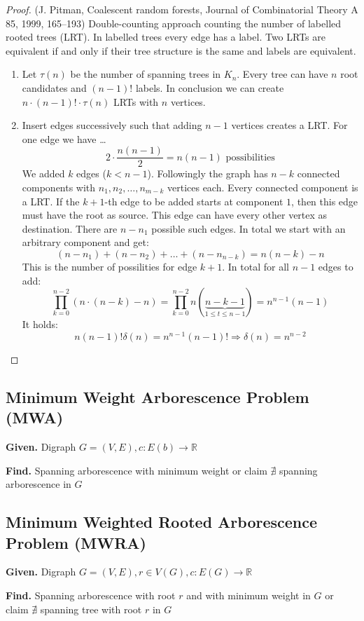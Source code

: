\documentclass{article}
\newcommand{\given}[1]{\textbf{Given.} #1\par}
\newcommand{\find}[1]{\textbf{Find.} #1\par}
\begin{document}
\begin{proof}
(J. Pitman, Coalescent random forests, Journal of Combinatorial Theory A 85, 1999, 165--193)
Double-counting approach counting the number of labelled rooted trees (LRT). In labelled trees every edge has a label. Two LRTs are equivalent if and only if their tree structure is the same and labels are equivalent.

\begin{enumerate}
  \item Let $\tau(n)$ be the number of spanning trees in $K_n$. Every tree can have $n$ root candidates and $(n-1)!$ labels. In conclusion we can create $n \cdot (n-1)! \cdot \tau(n)$ LRTs with $n$ vertices.
  \item Insert edges successively such that adding $n-1$ vertices creates a LRT. For one edge we have \dots
    \[
      2 \cdot \frac{n(n-1)}{2} = n(n-1) \text{ possibilities}
    \]
    We added $k$ edges ($k < n -1$). Followingly the graph has $n-k$ connected components with $n_1, n_2, \ldots, n_{m-k}$ vertices each. Every connected component is a LRT. If the $k+1$-th edge to be added starts at component $1$, then this edge must have the root as source. This edge can have every other vertex as destination. There are $n-n_1$ possible such edges. In total we start with an arbitrary component and get:
    \[
      (n - n_1) + (n - n_2) + \ldots + (n - n_{n-k}) = n (n-k) - n
    \]
    This is the number of possilities for edge $k+1$.
    In total for all $n-1$ edges to add:
    \[
      \prod_{k=0}^{n-2} (n \cdot (n-k) - n) = \prod_{k=0}^{n-2} n (\underbrace{n - k - 1}_{1 \leq t \leq n-1}) = n^{n-1} (n - 1)
    \]
    It holds:
    \[
      n (n-1) ! \delta(n) = n^{n-1} (n-1)! \Rightarrow \delta(n) = n^{n-2}
    \]
\end{enumerate}
\end{proof}

\subsection{Minimum Weight Arborescence Problem (MWA)}
%
\given{Digraph $G = (V, E), c: E(b) \rightarrow \mathbb{R}$}
\find{Spanning arborescence with minimum weight or claim $\nexists$ spanning arborescence in $G$}
%
\subsection{Minimum Weighted Rooted Arborescence Problem (MWRA)}
%
\given{Digraph $G = (V, E), r \in V(G), c: E(G) \rightarrow \mathbb{R}$}
\find{Spanning arborescence with root $r$ and with minimum weight in $G$ or claim $\nexists$ spanning tree with root $r$ in $G$}
%
\end{document}
